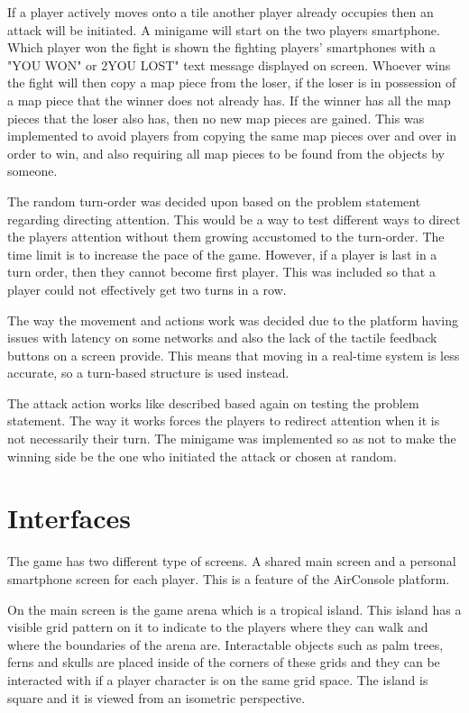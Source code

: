 If a player actively moves onto a tile another player already occupies then an attack will be initiated. A minigame will start on the two players smartphone. Which player won the fight is shown the fighting players' smartphones with a "YOU WON" or 2YOU LOST" text message displayed on screen. Whoever wins the fight will then copy a map piece from the loser, if the loser is in possession of a map piece that the winner does not already has. If the winner has all the map pieces that the loser also has, then no new map pieces are gained. This was implemented to avoid players from copying the same map pieces over and over in order to win, and also requiring all map pieces to be found from the objects by someone.

The random turn-order was decided upon based on the problem statement regarding directing attention. This would be a way to test different ways to direct the players attention without them growing accustomed to the turn-order. The time limit is to increase the pace of the game. However, if a player is last in a turn order, then they cannot become first player. This was included so that a player could not effectively get two turns in a row.

The way the movement and actions work was decided due to the platform having issues with latency on some networks and also the lack of the tactile feedback buttons on a screen provide. This means that moving in a real-time system is less accurate, so a turn-based structure is used instead.

The attack action works like described based again on testing the problem statement. The way it works forces the players to redirect attention when it is not necessarily their turn. The minigame was implemented so as not to make the winning side be the one who initiated the attack or chosen at random.

\section{Interfaces}
The game has two different type of screens. A shared main screen and a personal smartphone screen for each player. This is a feature of the AirConsole platform.

On the main screen is the game arena which is a tropical island. This island has a visible grid pattern on it to indicate to the players where they can walk and where the boundaries of the arena are. Interactable objects such as palm trees, ferns and skulls are placed inside of the corners of these grids and they can be interacted with if a player character is on the same grid space. The island is square and it is viewed from an isometric perspective. 

